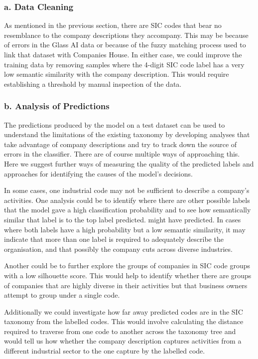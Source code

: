 \documentclass[
]{article}
\begin{document}
\hypertarget{a.-data-cleaning}{%
\subsubsection{a. Data Cleaning}\label{a.-data-cleaning}}

As mentioned in the previous section, there are SIC codes that bear no
resemblance to the company descriptions they accompany. This may be
because of errors in the Glass AI data or because of the fuzzy matching
process used to link that dataset with Companies House. In either case,
we could improve the training data by removing samples where the 4-digit
SIC code label has a very low semantic similarity with the company
description. This would require establishing a threshold by manual
inspection of the data.

\hypertarget{b.-analysis-of-predictions}{%
\subsubsection{b. Analysis of
Predictions}\label{b.-analysis-of-predictions}}

The predictions produced by the model on a test dataset can be used to
understand the limitations of the existing taxonomy by developing
analyses that take advantage of company descriptions and try to track
down the source of errors in the classifier. There are of course
multiple ways of approaching this. Here we suggest further ways of
measuring the quality of the predicted labels and approaches for
identifying the causes of the model's decisions.

In some cases, one industrial code may not be sufficient to describe a
company's activities. One analysis could be to identify where there are
other possible labels that the model gave a high classification
probability and to see how semantically similar that label is to the top
label predicted. might have predicted. In cases where both labels have a
high probability but a low semantic similarity, it may indicate that
more than one label is required to adequately describe the organisation,
and that possibly the company cuts across diverse industries.

Another could be to further explore the groups of companies in SIC code
groups with a low silhouette score. This would help to identify whether
there are groups of companies that are highly diverse in their
activities but that business owners attempt to group under a single
code.

Additionally we could investigate how far away predicted codes are in
the SIC taxonomy from the labelled codes. This would involve calculating
the distance required to traverse from one code to another across the
taxonomy tree and would tell us how whether the company description
captures activities from a different industrial sector to the one
capture by the labelled code.
\end{document}
